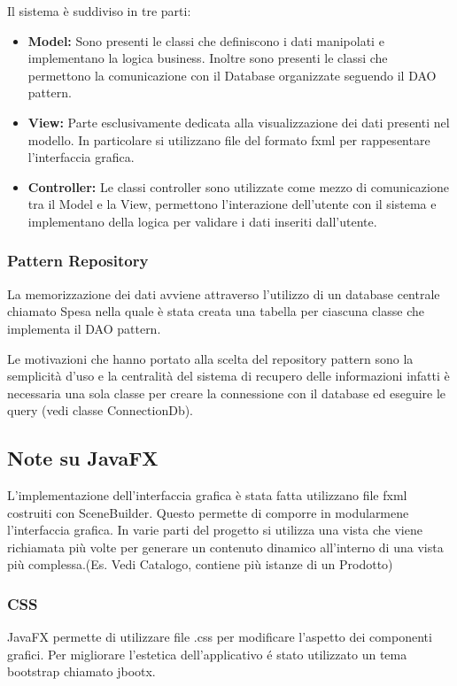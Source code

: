 \documentclass{article}
\begin{document}
\noindent Il sistema è suddiviso in tre parti:
\begin{itemize}
    \item{\textbf{Model:}
            Sono presenti le classi che definiscono i dati manipolati
            e implementano la logica business.
            Inoltre sono presenti le classi che permettono la comunicazione
            con il Database organizzate seguendo il DAO pattern.
        }
    \item{\textbf{View:}
            Parte esclusivamente dedicata alla visualizzazione dei dati
            presenti nel modello.
            In particolare si utilizzano file del formato fxml per rappesentare
            l'interfaccia grafica.
        }
    \item{\textbf{Controller:}
            Le classi controller sono utilizzate come mezzo di comunicazione
            tra il Model e la View, permettono l'interazione dell'utente con il
            sistema e implementano della logica per validare i dati inseriti dall'utente.
        }
\end{itemize}
\subsubsection{Pattern Repository}
\noindent La memorizzazione dei dati avviene attraverso l'utilizzo di un database centrale chiamato Spesa nella quale è stata creata una tabella per ciascuna classe che implementa il DAO pattern. 

Le motivazioni che hanno portato alla scelta del repository pattern sono la semplicità d'uso e la centralità del sistema di recupero delle informazioni infatti è necessaria una sola classe per creare la connessione con il database ed eseguire le query (vedi classe ConnectionDb). 
\subsection{Note su JavaFX}
L'implementazione dell'interfaccia grafica è stata fatta utilizzano file fxml costruiti con SceneBuilder.
Questo permette di comporre in modularmene l'interfaccia grafica.
In varie parti del progetto si utilizza una vista che viene richiamata più volte per generare un contenuto
dinamico all'interno di una vista più complessa.(Es. Vedi Catalogo, contiene più istanze di un Prodotto)
\subsubsection{CSS}
JavaFX permette di utilizzare file .css per modificare l'aspetto dei componenti grafici.
Per migliorare l'estetica dell'applicativo é stato utilizzato un tema bootstrap chiamato jbootx.
\end{document}
